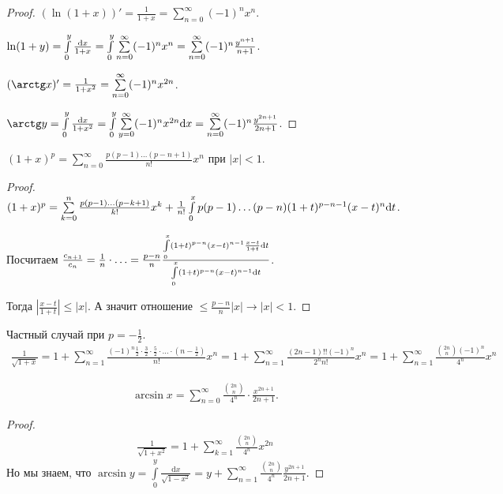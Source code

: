 \begin{proof}
    $(\ln (1+x))' = \frac{1}{1+x} = \sum\limits_{n=0}^\infty (-1)^n x^n$.

    $\ln(1+y) = \int\limits_0^y \frac{\mathrm{d}x}{1+x} = \int\limits_0^y \sum\limits_{n=0}^\infty (-1)^n x^n = \sum\limits_{n=0}^\infty (-1)^n \frac{y^{n+1}}{n+1}$.

     $(\arctg x)' = \frac{1}{1+x^2} = \sum\limits_{n=0}^\infty (-1)^n x^{2n}$.

     $\arctg y = \int\limits_0^y \frac{\dx}{1+x^2} = \int\limits_0^y \sum\limits_{y=0}^\infty (-1)^n x^{2n} \dx = \sum\limits_{n=0}^\infty (-1)^n \frac{y^{2n+1}}{2n+1}$.
\end{proof}
\begin{example}
    $(1+x)^p = \sum\limits_{n=0}^\infty \frac{p(p-1)\ldots(p-n+1)}{n!}x^n$ при $|x| < 1$.
\end{example}
\begin{proof}
    $(1+x)^p = \sum\limits_{k=0}^n \frac{p(p-1)\ldots (p-k+1)}{k!}x^k + \frac{1}{n!}\int\limits_0^x p(p-1)\ldots (p-n)(1+t)^{p-n-1}(x-t)^n \mathrm{d}t$. 

    Посчитаем $\frac{c_{n+1}}{c_n} = \frac{1}{n} \cdot \ldots = \frac{p-n}{n} \frac{\int\limits_0^x (1+t)^{p-n}(x-t)^{n-1}\frac{x-t}{1+t} \mathrm{d}t}{\int\limits_0^x (1+t)^{p-n} (x-t)^{n-1}\mathrm{d}t}$.

    Тогда $\left| \frac{x-t}{1+t} \right| \le |x|$. А значит отношение $\le \frac{p - n}{n}|x| \to |x| < 1$.
\end{proof}
\begin{example}
    Частный случай при  $p = -\frac{1}{2}$. 
    \begin{align*}
        \frac{1}{\sqrt{1+x}} = 1 + \sum\limits_{n=1}^\infty \frac{(-1)^n\frac{1}{2} \cdot \frac{3}{2} \cdot \frac{5}{2} \cdot \ldots \cdot (n-\frac{1}{2})}{n!}x^n = 1 + \sum \limits_{n=1}^\infty \frac{(2n-1)!!(-1)^n}{2^nn!}x^n = 1 + \sum\limits_{n=1}^\infty \frac{\binom{2n}{n}(-1)^n}{4^n}x^n
    \end{align*}
\end{example}
\begin{example}
    \begin{align*}
        \arcsin x = \sum\limits_{n=0}^\infty \frac{\binom{2n}{n}}{4^n} \cdot \frac{x^{2n+1}}{2n+1}.
    \end{align*}
\end{example}
\begin{proof}
     \begin{align*}
        \frac{1}{\sqrt{1+x^2}} = 1 + \sum\limits_{k=1}^\infty \frac{\binom{2n}{n}}{4^n}x^{2n}
    \end{align*}
    Но мы знаем, что $\arcsin y = \int\limits_0^y \frac{\mathrm{d}x}{\sqrt{1-x^2}} = y + \sum\limits_{n=1}^\infty \frac{\binom{2n}{n}}{4^n} \frac{y^{2n+1}}{2n+1}$.
\end{proof}

